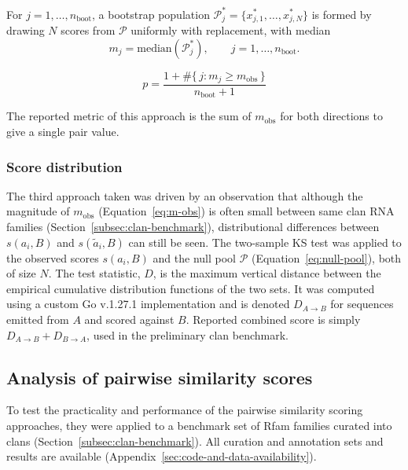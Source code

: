 For $j = 1,\dots,n_{\mathrm{boot}}$, a bootstrap population $\mathcal{P}^{*}_j = \{x^{*}_{j,1},\dots,x^{*}_{j,N}\}$ is formed by drawing $N$ scores from $\mathcal{P}$ uniformly with replacement, with median
\begin{equation}
  \label{eq:boot-median}
  m_j = \mathrm{median}\!\left(\mathcal{P}^{*}_j\right), \qquad j = 1,\dots,n_{\mathrm{boot}}.
\end{equation}

\begin{equation}
  \label{eq:empirical-p}
  p = \frac{1 + \#\{\, j : m_j \geq m_{\mathrm{obs}} \,\}}{n_{\mathrm{boot}} + 1}
\end{equation}

The reported metric of this approach is the sum of $m_{\mathrm{obs}}$ for both directions to give a single pair value.

\subsubsection{Score distribution}
\label{subsubsec:score-distribution}

The third approach taken was driven by an observation that although the magnitude of $m_{\mathrm{obs}}$ (Equation~\ref{eq:m-obs}) is often small between same clan RNA families (Section~\ref{subsec:clan-benchmark}), distributional differences between $s(a_i, B)$ and $s(\tilde{a}_i, B)$ can still be seen. 
The two-sample \ac{KS} test \citep{Smirnov1939} was applied to the observed scores $s(a_i, B)$ and the null pool $\mathcal{P}$ (Equation~\ref{eq:null-pool}), both of size $N$. 
The test statistic, $D$, is the maximum vertical distance between the empirical cumulative distribution functions of the two sets. 
It was computed using a custom Go v.1.27.1 implementation and is denoted $D_{A \rightarrow B}$ for sequences emitted from $A$ and scored against $B$.
Reported combined score is simply $D_{A \rightarrow B} + D_{B \rightarrow A}$, used in the preliminary clan benchmark.

\subsection{Analysis of pairwise similarity scores}
\label{subsec:clustering-analysis}

To test the practicality and performance of the pairwise similarity scoring approaches, they were applied to a benchmark set of Rfam families curated into clans (Section~\ref{subsec:clan-benchmark}).
All curation and annotation sets and results are available (Appendix~\ref{sec:code-and-data-availability}).


